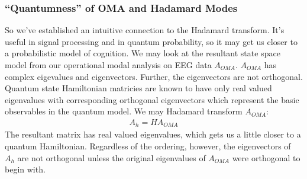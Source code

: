 \subsubsection{``Quantumness'' of OMA and Hadamard Modes}
So we've established an intuitive connection to the Hadamard transform. It's useful in signal processing and in quantum probability, so it may get us closer to a probabilistic model of cognition. We may look at the resultant state space model from our operational modal analysis on EEG data $A_{OMA}$. $A_{OMA}$ has complex eigevalues and eigenvectors. Further, the eigenvectors are not orthogonal. Quantum state Hamiltonian matricies are known to have only real valued eigenvalues with corresponding orthogonal eigenvectors which represent the basic observables in the quantum model. We may Hadamard transform $A_{OMA}$:
\begin{align}
A_{h}=HA_{OMA}
\end{align}
The resultant matrix has real valued eigenvalues, which gets us a little closer to a quantum Hamiltonian. Regardless of the ordering, however, the eigenvectors of $A_h$ are not orthogonal unless the original eigenvalues of $A_{OMA}$ were orthogonal to begin with. 

